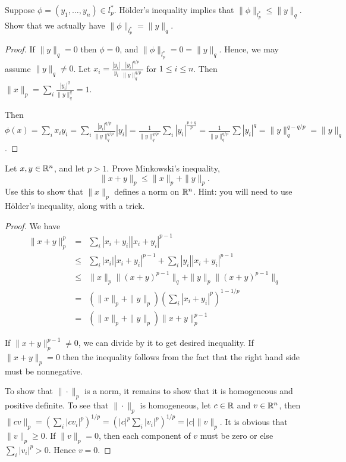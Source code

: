 \documentclass{article}
\begin{document}
 Suppose $\phi =(y_1, \ldots, y_n) \in l_p^*$. H\"{o}lder's inequality implies that $\|\phi\|_{l_p^*} \le \|y\|_q$. Show that we actually have $\|\phi\|_{l_p^*}  = \|y \|_q$.
\begin{proof}
If $\|y\|_q = 0$ then $\phi = 0$, and $\|\phi\|_{l_p^*} = 0 = \|y\|_q$.  Hence, we may assume $\|y\|_q \neq 0$.
Let $x_i = \frac {|y_i|} {y_i} \frac {|y_i|^{q/p}}{\|y\|_q^{q/p}}$ for $1 \le i \le n$.  Then $\|x\|_p = \sum_i \frac {|y_i|^q} {\|y\|_q^q} = 1$.

Then $\phi(x) = \sum_i x_i y_i = \sum_i \frac {|y_i|^{q/p}}{\|y\|_q^{q/p}} |y_i| = \frac 1 {\|y\|_q^{q/p}} \sum_i |y_i|^{\frac {p + q} p }  = \frac 1 {\|y\|_q^{q/p}} \sum |y_i|^q = \|y\|_q^{q - q/p} = \|y\|_q$.

\end{proof}

 Let $x,y \in \mathbb{R}^n$, and let $p > 1$. Prove Minkowski's inequality, 
$$\|x + y \|_p \le \|x\|_p + \|y\|_p. $$
Use this to show that $\|x\|_p$ defines a norm on $\mathbb{R}^n$. Hint: you will need to use H\"{o}lder's inequality, along with a trick.

\begin{proof}
We have 
\begin{align*}
\|x + y \|_p^p & = & \sum_i |x_i + y_i| |x_i + y_i|^{p-1}
\\ & \le & \sum_i |x_i| |x_i + y_i|^{p-1} + \sum_i |y_i| |x_i + y_i|^{p-1}
\\ & \le &  \|x\|_p \|(x + y)^{p-1}\|_q +  \|y\|_p \|(x + y)^{p-1}\|_q
\\ & = & ( \|x\|_p + \|y\|_p) \left( \sum_i |x_i + y_i|^p \right)^{1 - 1/p}
\\ & = &  ( \|x\|_p + \|y\|_p) \|x + y \|_p^{p - 1}
\end{align*}

If $\|x + y\|_p^{p-1} \neq 0$, we can divide by it to get desired inequality. If $\|x + y \|_p = 0$ then the inequality follows from the fact that the right hand side must be nonnegative.

To show that $\| \cdot \|_p$ is a norm, it remains to show that it is homogeneous and positive definite. To see that $\| \cdot \|_p$ is homogeneous, let $c \in \mathbb{R}$ and $v \in \mathbb{R}^n$, then $\|c v\|_p = \left( \sum_i |c v_i|^p \right)^{1/p} = \left(|c|^p \sum_i | v_i|^p \right)^{1/p} = |c| \|v\|_p$. It is obvious that $\|v\|_p \ge 0$.  If $\|v\|_p = 0$, then each component of $v$ must be zero or else $\sum_i |v_i|^p > 0$. Hence $v = 0$.

\end{proof}
\end{document}
